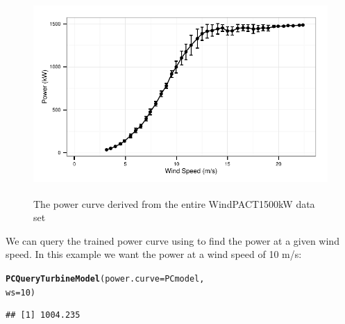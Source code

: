 \documentclass[nojss]{jss}\usepackage[]{graphicx}\usepackage[]{color}
\makeatletter
\newcommand{\hlnum}[1]{\textcolor[rgb]{0.686,0.059,0.569}{#1}}%
\newcommand{\hlstd}[1]{\textcolor[rgb]{0.345,0.345,0.345}{#1}}%
\newcommand{\hlkwc}[1]{\textcolor[rgb]{0.333,0.667,0.333}{#1}}%
\newcommand{\hlkwd}[1]{\textcolor[rgb]{0.737,0.353,0.396}{\textbf{#1}}}%
\newenvironment{kframe}{%
 \def\at@end@of@kframe{}%
 \ifinner\ifhmode%
  \def\at@end@of@kframe{\end{minipage}}%
  \begin{minipage}{\columnwidth}%
 \fi\fi%
 \def\FrameCommand##1{\hskip\@totalleftmargin \hskip-\fboxsep
 \colorbox{shadecolor}{##1}\hskip-\fboxsep
     \hskip-\linewidth \hskip-\@totalleftmargin \hskip\columnwidth}%
 \MakeFramed {\advance\hsize-\width
   \@totalleftmargin\z@ \linewidth\hsize
   \@setminipage}}%
 {\par\unskip\endMakeFramed%
 \at@end@of@kframe}
\newenvironment{knitrout}{}{} %
\makeatother
\begin{document}
\begin{knitrout}
\color{fgcolor}\begin{kframe}


{\ttfamily\noindent\color{warningcolor}{\#\# Warning in loop\_apply(n, do.ply): Removed 5 rows containing missing values (geom\_path).}}

{\ttfamily\noindent\color{warningcolor}{\#\# Warning in loop\_apply(n, do.ply): Removed 5 rows containing missing values (geom\_point).}}\end{kframe}\begin{figure}[h]

{\centering \includegraphics[width=5in,height=3in]{figure/PCdemo-1} 

}

\caption[The power curve derived from the entire WindPACT1500kW data set]{The power curve derived from the entire WindPACT1500kW data set}\label{fig:PCdemo}
\end{figure}


\end{knitrout}

We can query the trained power curve using  to find the power at a given wind speed. In this example we want the power at a wind speed of 10 m/s:
\begin{knitrout}
\color{fgcolor}\begin{kframe}
\begin{alltt}
\hlkwd{PCQueryTurbineModel}\hlstd{(}\hlkwc{power.curve} \hlstd{= PCmodel,}
                    \hlkwc{ws} \hlstd{=} \hlnum{10}\hlstd{)}
\end{alltt}
\begin{verbatim}
## [1] 1004.235
\end{verbatim}
\end{kframe}
\end{knitrout}
\end{document}
